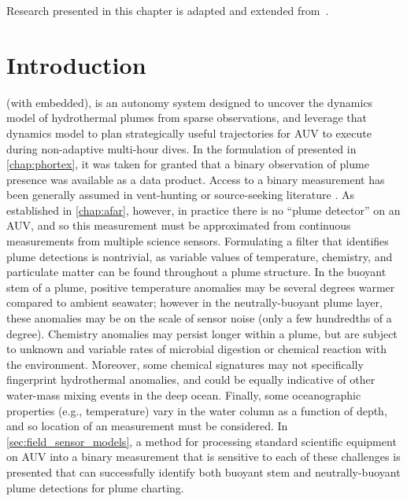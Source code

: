 Research presented in this chapter is adapted and extended from~\cite{preston2022physically}.   


\section{Introduction}
\PHORTEX (with \PHUMES embedded), is an autonomy system designed to uncover the dynamics model of hydrothermal plumes from sparse observations, and leverage that dynamics model to plan strategically useful trajectories for AUV \Sentry to execute during non-adaptive multi-hour dives. In the formulation of \PHUMES presented in \cref{chap:phortex}, it was taken for granted that a binary observation of plume presence was available as a data product. Access to a binary measurement has been generally assumed in vent-hunting or source-seeking literature \autocite{tian2014behavior,saigol2009information,jakuba2007stochastic}. As established in \cref{chap:afar}, however, in practice there is no ``plume detector'' on an AUV, and so this measurement must be approximated from continuous measurements from multiple science sensors. Formulating a filter that identifies plume detections is nontrivial, as variable values of temperature, chemistry, and particulate matter can be found throughout a plume structure. In the buoyant stem of a plume, positive temperature anomalies may be several degrees warmer compared to ambient seawater; however in the neutrally-buoyant plume layer, these anomalies may be on the scale of sensor noise (only a few hundredths of a degree). Chemistry anomalies may persist longer within a plume, but are subject to unknown and variable rates of microbial digestion or chemical reaction with the environment. Moreover, some chemical signatures may not specifically fingerprint hydrothermal anomalies, and could be equally indicative of other water-mass mixing events in the deep ocean. Finally, some oceanographic properties (e.g., temperature) vary in the water column as a function of depth, and so location of an measurement must be considered. In \cref{sec:field_sensor_models}, a method for processing standard scientific equipment on AUV \Sentry into a binary measurement that is sensitive to each of these challenges is presented that can successfully identify both buoyant stem and neutrally-buoyant plume detections for plume charting.


